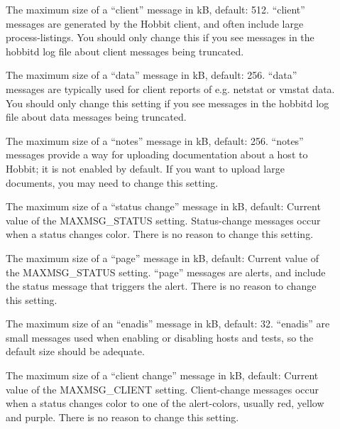 \begin{description}
 

\item[] The maximum size of a ``client'' message
  in kB, default: 512. ``client'' messages are generated by the Hobbit
  client, and often include large process-listings. You should only
  change this if you see messages in the hobbitd log file about client
  messages being truncated. 


 

\item[] The maximum size of a ``data'' message in
  kB, default: 256. ``data'' messages are typically used for client
  reports of e.g. netstat or vmstat data. You should only change this
  setting if you see messages in the hobbitd log file about data
  messages being truncated. 


 

\item[] The maximum size of a ``notes'' message
  in kB, default: 256. ``notes'' messages provide a way for uploading
  documentation about a host to Hobbit; it is not enabled by
  default. If you want to upload large documents, you may need to
  change this setting. 


 

\item[] The maximum size of a ``status change''
  message in kB, default: Current value of the MAXMSG\_STATUS
  setting. Status-change messages occur when a status changes
  color. There is no reason to change this setting. 


 

\item[] The maximum size of a ``page'' message in
  kB, default: Current value of the MAXMSG\_STATUS setting. ``page''
  messages are alerts, and include the status message that triggers
  the alert. There is no reason to change this setting. 



\item[] The maximum size of an ``enadis''
  message in kB, default: 32. ``enadis'' are small messages used when
  enabling or disabling hosts and tests, so the default size should be
  adequate. 


 

\item[] The maximum size of a ``client change''
  message in kB, default: Current value of the MAXMSG\_CLIENT
  setting. Client-change messages occur when a status changes color to
  one of the alert-colors, usually red, yellow and purple. There is no
  reason to change this setting. 



\end{description}

